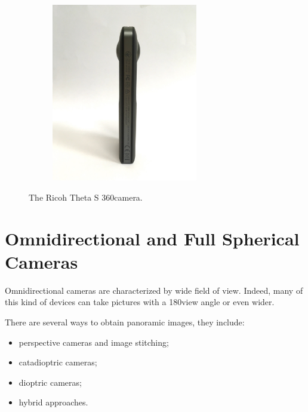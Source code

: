 \begin{figure}[h]
\begin{subfigure}{0.3\textwidth}
	\end{subfigure}
	\begin{subfigure}{0.3\textwidth}
		\centering
		\includegraphics[width=0.7\textwidth]{img/theta3}
	\end{subfigure}
	\caption{\label{fig:disparity_example}The Ricoh Theta S 360\degree camera.}
\end{figure}

\section{Omnidirectional and Full Spherical Cameras}
\label{sec:cameraclassification}
Omnidirectional cameras are characterized by wide field of view. Indeed, many of this kind of devices can take pictures with a 180\degree view angle or even wider.

There are several ways to obtain panoramic images, they include:
\begin{itemize}
	\item perspective cameras and image stitching;
	\item catadioptric cameras;
	\item dioptric cameras;
	\item hybrid approaches.
\end{itemize}

